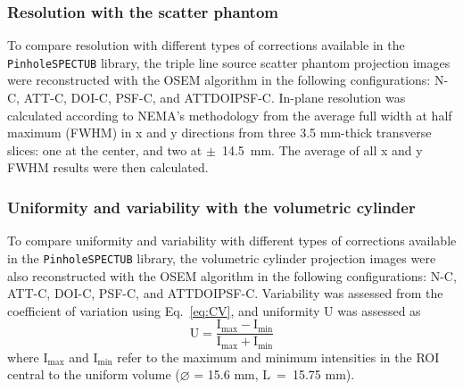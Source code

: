 \documentclass[utf8]{FrontiersinHarvard} %
\begin{document}
\subsubsection{Resolution with the scatter phantom}

To compare resolution with different types of corrections available in the \texttt{PinholeSPECTUB} library, the triple line source scatter phantom projection images were reconstructed with the OSEM algorithm in the following configurations: N-C, ATT-C, DOI-C, PSF-C, and ATTDOIPSF-C. In-plane resolution was calculated according to NEMA's methodology from the average full width at half maximum (FWHM) in x and y directions from three 3.5 mm-thick transverse slices: one at the center, and two at $\pm$~14.5~mm. The average of all x and y FWHM results were then calculated.

\subsubsection{Uniformity and variability with the volumetric cylinder}

To compare uniformity and variability with different types of corrections available in the \texttt{PinholeSPECTUB} library, the volumetric cylinder projection images were also reconstructed with the OSEM algorithm in the following configurations: N-C, ATT-C, DOI-C, PSF-C, and \mbox{ATTDOIPSF-C}. Variability was assessed from the coefficient of variation using Eq.~\ref{eq:CV}, and uniformity $\mathrm{U}$ was assessed as
\begin{equation}
	\mathrm{U} = \frac{\mathrm{I_{max}} - \mathrm{I_{min}}}{\mathrm{I_{max}} + \mathrm{I_{min}}}
\end{equation}
where $\mathrm{I_{max}}$ and $\mathrm{I_{min}}$ refer to the maximum and minimum intensities in the ROI central to the uniform volume ($\diameter$ = 15.6 mm, $\mathrm{L}$~=~15.75 mm). 

\end{document}
